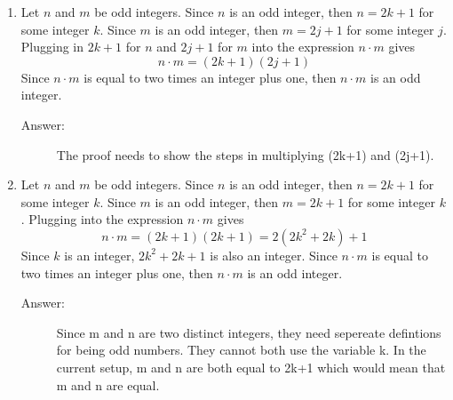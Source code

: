 \documentclass[12pt, oneside]{article}
\begin{document}
\begin{enumerate}
\begin{enumerate}
    \item Let $n$ and $m$ be odd integers. Since $n$ is an odd integer, then $n = 2k+1$ for some integer $k$. Since $m$ is an odd integer, then $m = 2j+1$ for some integer $j$. Plugging in $2k+1$ for $n$ and $2j+1$ for $m$ into the expression $n\cdot m$ gives
    \[n\cdot m=(2k+1)(2j+1)\]
    Since $n\cdot m$ is equal to two times an integer plus one, then $n\cdot m$ is an odd integer.
    
    \begin{description}
        \item[Answer:] The proof needs to show the steps in multiplying (2k+1) and (2j+1).
    \end{description}
    
    \item Let $n$ and $m$ be odd integers. Since $n$ is an odd integer, then $n = 2k+1$ for some integer $k$. Since $m$ is an odd integer, then $m = 2k+1$ for some integer $k$. Plugging into the expression $n\cdot m$ gives
    \[n\cdot m=(2k+1)(2k+1)=2(2k^2+2k)+1\]
    Since $k$ is an integer, $2k^2+2k+1$ is also an integer. Since $n\cdot m$ is equal to two times an integer plus one, then $n\cdot m$ is an odd integer.

    \begin{description}
        \item[Answer:] Since m and n are two distinct integers, they need sepereate defintions for being odd numbers. They cannot both use the variable k. In the current setup, m and n are both equal to 2k+1 which would mean that m and n are equal.
    \end{description}

\end{enumerate}

\quad

    

\end{enumerate}
\end{document}
